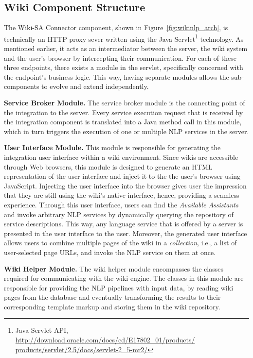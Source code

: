 \subsection{Wiki Component Structure}
The Wiki-SA Connector component, shown in Figure~\ref{fig:wikinlp_arch}, is technically an HTTP proxy sever written using the Java Servlet\footnote{Java Servlet API, \url{http://download.oracle.com/docs/cd/E17802_01/products/ products/servlet/2.5/docs/servlet-2_5-mr2/}} technology. As mentioned earlier, it acts as an intermediator between the \sa server, the wiki system and the user's browser by intercepting their communication. For each of these three endpoints, there exists a module in the servlet, specifically concerned with the endpoint's business logic. This way, having separate modules allows the sub-components to evolve and extend independently.

\blankline
\noindent
\textbf{Service Broker Module. }{The service broker module is the connecting point of the integration to the \sa server. Every service execution request that is received by the integration component is translated into a Java method call in this module, which in turn triggers the execution of one or multiple NLP services in the \sa server.}

\blankline
\noindent
\textbf{User Interface Module. }{This module is responsible for generating the integration user interface within a wiki environment. Since wikis are accessible through Web browsers, this module is designed to generate an HTML representation of the \sa user interface and inject it to the the user's browser using JavaScript. Injecting the user interface into the browser gives user the impression that they are still using the wiki's native interface, hence, providing a seamless experience. Through this user interface, users can find the \emph{Available Assistants} and invoke arbitrary NLP services by dynamically querying the \sa repository of service descriptions. This way, any language service that is offered by a \sa server is presented in the user interface to the user. Moreover, the generated user interface allows users to combine multiple pages of the wiki in a \emph{collection}, i.e., a list of user-selected page URLs, and invoke the NLP service on them at once.}

\blankline
\noindent
\textbf{Wiki Helper Module. }{The wiki helper module encompasses the classes required for communicating with the wiki engine. The classes in this module are responsible for providing the NLP pipelines with input data, by reading wiki pages from the database and eventually transforming the results to their corresponding template markup and storing them in the wiki repository.}

